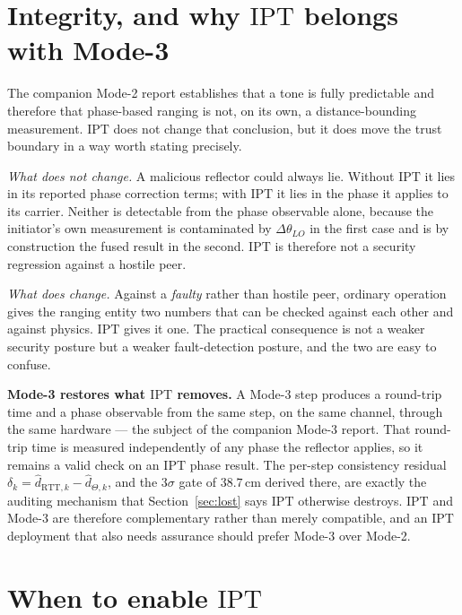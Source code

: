 \documentclass[11pt,a4paper]{article}
\newcommand{\IPT}{\ensuremath{\mathrm{IPT}}}
\newcommand{\RTT}{\ensuremath{\mathrm{RTT}}}
\begin{document}
\section{Integrity, and why \IPT{} belongs with Mode-3}
\label{sec:integrity}

The companion Mode-2 report establishes that a tone is fully predictable and therefore that
phase-based ranging is not, on its own, a distance-bounding measurement. \IPT{} does not change that
conclusion, but it does move the trust boundary in a way worth stating precisely.

\emph{What does not change.} A malicious reflector could always lie. Without \IPT{} it lies in its
reported phase correction terms; with \IPT{} it lies in the phase it applies to its carrier. Neither
is detectable from the phase observable alone, because the initiator's own measurement is
contaminated by $\Delta\theta_{LO}$ in the first case and is by construction the fused result in the
second. \IPT{} is therefore not a security regression against a hostile peer.

\emph{What does change.} Against a \emph{faulty} rather than hostile peer, ordinary operation gives
the ranging entity two numbers that can be checked against each other and against physics. \IPT{}
gives it one. The practical consequence is not a weaker security posture but a weaker fault-detection
posture, and the two are easy to confuse.

\begin{callout}
\textbf{Mode-3 restores what \IPT{} removes.} A Mode-3 step produces a round-trip time and a phase
observable from the same step, on the same channel, through the same hardware --- the subject of the
companion Mode-3 report. That round-trip time is measured independently of any phase the reflector
applies, so it remains a valid check on an \IPT{} phase result. The per-step consistency residual
$\delta_k = \hat d_{\RTT,k} - \hat d_{\Theta,k}$, and the $3\sigma$ gate of $38.7$\,cm derived there,
are exactly the auditing mechanism that Section~\ref{sec:lost} says \IPT{} otherwise destroys.
\IPT{} and Mode-3 are therefore complementary rather than merely compatible, and an \IPT{}
deployment that also needs assurance should prefer Mode-3 over Mode-2.
\end{callout}


\section{When to enable \IPT}
\label{sec:decision}
\end{document}
